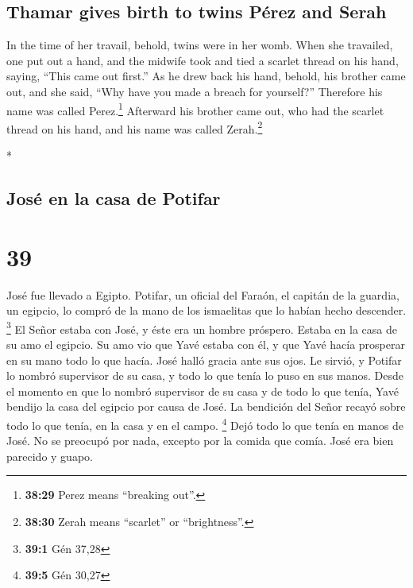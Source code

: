 \begin{paracol}{2}
\begin{otherlanguage}{english}
\hypertarget{thamar-gives-birth-to-twins-puxe9rez-and-serah}{%
\subsection{Thamar gives birth to twins Pérez and
Serah}\label{thamar-gives-birth-to-twins-puxe9rez-and-serah}}

 In the time of her travail, behold, twins were in her
womb.  When she travailed, one put out a hand, and the
midwife took and tied a scarlet thread on his hand, saying, ``This came
out first.''  As he drew back his hand, behold, his
brother came out, and she said, ``Why have you made a breach for
yourself?'' Therefore his name was called Perez.\footnote{\textbf{38:29}
  Perez means ``breaking out''.}  Afterward his brother
came out, who had the scarlet thread on his hand, and his name was
called Zerah.\footnote{\textbf{38:30} Zerah means ``scarlet'' or
  ``brightness''.}

\end{otherlanguage}

\switchcolumn[0]*

\hypertarget{josuxe9-en-la-casa-de-potifar}{%
\subsection{José en la casa de
Potifar}\label{josuxe9-en-la-casa-de-potifar}}

\hypertarget{section-76}{%
\section{39}\label{section-76}}

 José fue llevado a Egipto. Potifar, un oficial del
Faraón, el capitán de la guardia, un egipcio, lo compró de la mano de
los ismaelitas que lo habían hecho descender. \footnote{\textbf{39:1}
  Gén 37,28}  El Señor estaba con José, y éste era un
hombre próspero. Estaba en la casa de su amo el egipcio. 
Su amo vio que Yavé estaba con él, y que Yavé hacía prosperar en su mano
todo lo que hacía.  José halló gracia ante sus ojos. Le
sirvió, y Potifar lo nombró supervisor de su casa, y todo lo que tenía
lo puso en sus manos.  Desde el momento en que lo nombró
supervisor de su casa y de todo lo que tenía, Yavé bendijo la casa del
egipcio por causa de José. La bendición del Señor recayó sobre todo lo
que tenía, en la casa y en el campo. \footnote{\textbf{39:5} Gén 30,27}
 Dejó todo lo que tenía en manos de José. No se preocupó
por nada, excepto por la comida que comía. José era bien parecido y
guapo.


\end{paracol}

